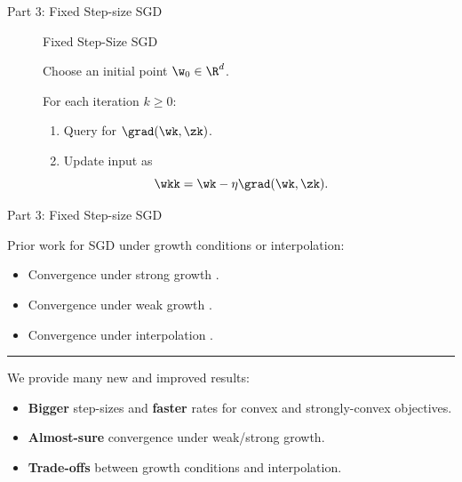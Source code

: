 \documentclass[mathserif,notheorems, hyperref={colorlinks, citecolor=blue, urlcolor=blue, linkcolor=blue}]{beamer}
\begin{document}
    \begin{frame}{Part 3: Fixed Step-size SGD}
       
        \begin{figure}[t]
        \begin{procedure}{Fixed Step-Size SGD}
        \item Choose an initial point \( \w_0 \in \R^d \).
            \vspace{2ex}
        \item For each iteration \( k \geq 0 \):
            \begin{enumerate}
                \item Query \oracle{} for \( \grad(\wk, \zk) \).
                    \vspace{1ex}
                \item Update input as\vspace{-1ex}%
                    \[ \wkk = \wk - \eta \grad(\wk, \zk). \]
            \end{enumerate}
        \end{procedure}
        \end{figure}


    \end{frame}

    \begin{frame}{Part 3: Fixed Step-size SGD}
        
        Prior work for SGD under growth conditions or interpolation: 
        \begin{itemize}
            \item Convergence under strong growth \citep{tseng1998incremental, solodov1998incremental, schmidt2013fast, cevher2018linear}.
            \item Convergence under weak growth \citep{vaswani2019fast}.
            \item Convergence under interpolation \citep{bassily2018exponential}. 
        \end{itemize}
        \vspace{2ex}

       \pause
       \rule{\textwidth}{0.5px}
       \vspace{1ex}

       We provide many new and improved results: 
       \begin{itemize}
           \item \textbf{Bigger} step-sizes and \textbf{faster} rates for convex and strongly-convex objectives. 
           \item \textbf{Almost-sure} convergence under weak/strong growth. 
           \item \textbf{Trade-offs} between growth conditions and interpolation. 
       \end{itemize}
    \end{frame}
\end{document}
